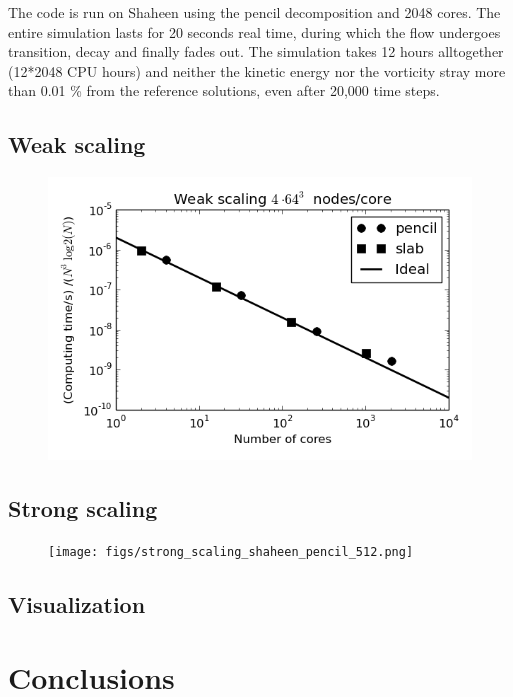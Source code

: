 \documentclass[11pt, oneside]{article}
\begin{document}
The code is run on Shaheen using the pencil decomposition and 2048 cores. The entire simulation lasts for 20 seconds real time, during which the flow undergoes transition, decay and finally fades out. The simulation takes 12 hours alltogether (12*2048 CPU hours) and neither the kinetic energy nor the vorticity stray more than 0.01 \% from the reference solutions, even after 20,000 time steps.

\subsection{Weak scaling}

\begin{figure}
\includegraphics[scale=1]{figs/weak_scaling_shaheen.png}
\end{figure}

\subsection{Strong scaling}
\begin{figure}
\texttt{[image: figs/strong\_scaling\_shaheen\_pencil\_512.png]}
\end{figure}

\subsection{Visualization}

\section{Conclusions}

\newpage
\appendix
\end{document}
